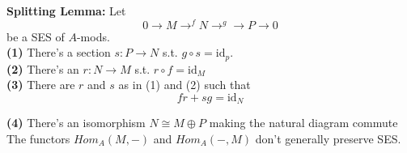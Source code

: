 \documentclass{article}
\begin{document}
\textbf{Splitting Lemma: } Let 
\[0 \to M \to^f N \to^g \to P \to 0\]
be a SES of $A$-mods.\\
\indent \textbf{(1)} There's a section $s: P \to N$ s.t. $g \circ s = \text{id}_p$.\\

\indent \textbf{(2)} There's an $r: N \to M$ s.t. $r \circ f = \text{id}_M$\\

\indent \textbf{(3)} There are $r$ and $s$ as in (1) and (2) such that 
\[fr + sg = \text{id}_N\]

\indent \textbf{(4)} There's an isomorphism $N \cong M \oplus P$ making the natural diagram commute\\

The functors $Hom_A(M,-)$ and $Hom_A(-,M)$ don't generally preserve SES.




















 
\end{document}

